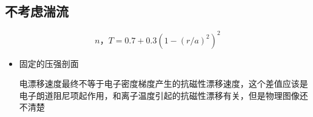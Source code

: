 \documentclass[11pt,a4paper]{article}
\begin{document}
\subsection{不考虑湍流}
$$ n，T = 0.7 + 0.3(1-(r/a)^2)^2 $$
\begin{itemize}
	\item 固定的压强剖面
	\begin{figure}[H]
		\centering
		\caption{}		
	\end{figure}
	电漂移速度最终不等于电子密度梯度产生的抗磁性漂移速度，这个差值应该是电子朗道阻尼项起作用，和离子温度引起的抗磁性漂移有关，但是物理图像还不清楚
	

\end{itemize}
\end{document}
